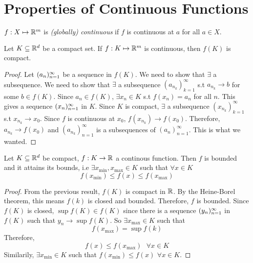 \documentclass[openany]{report}
\begin{document}
    \section{Properties of Continuous Functions}
    $f: X \mapsto \mathbb{R}^m$ is \emph{(globally) continuous} if $f$ is continuous at $a$ for all $a \in X$.
    \begin{theorem}
        Let $K \subseteq \mathbb{R}^d$ be a compact set. If $f: K \mapsto \mathbb{R}^m$ is continuous, then $f(K)$ is compact. 
    \end{theorem}
    \begin{proof}
        Let $({a}_n)_{n=1}^\infty$ be a sequence in $f(K)$. We need to show that $\exists$ a subsequence. We need to show that $\exists$ a subsequence $(a_{n_k})_{k=1}^\infty$ s.t $a_{n_k} \rightarrow b$ for some $b \in f(K)$. Since $a_n \in f(K)$, $\exists x_n \in K$ s.t $f(x_n) = a_n$ for all $n$. This gives a sequence $({x}_n)_{n=1}^\infty$ in $K$. Since $K$ is compact, $\exists$ a subsequence $(x_{n_k})_{k=1}^\infty$ s.t $x_{n_k} \rightarrow x_0$. Since $f$ is continuous at $x_0$, $f(x_{n_k}) \rightarrow f(x_0)$. Therefore, $a_{n_k} \rightarrow f(x_0)$ and $(a_{n_k})_{n=1}^\infty$ is a subsequences of $(a_n)_{n=1}^\infty$. This is what we wanted.
    \end{proof} 
\begin{corollary}
    Let $K \subseteq \mathbb{R}^d$ be compact, $f: K \rightarrow \mathbb{R}$ a continous function. Then $f$ is bounded and it attains its bounds, i.e $\exists x_{\min}, x_{\max} \in K$ such that $\forall x \in K$
    \[f(x_{\min}) \leq f(x) \leq f(x_{\max})\]
\end{corollary}
\begin{proof}
    From the previous result, $f(K)$ is compact in $\mathbb{R}$. By the Heine-Borel theorem, this means $f(k)$ is closed and bounded. Therefore, $f$ is bounded. Since $f(K)$ is closed, $\sup f(K) \in f(K)$ since there is a sequence $({y}_n)_{n=1}^\infty$ in $f(K)$ such that $y_n \rightarrow \sup f(K)$. So $\exists x_{\max} \in K$ such that 
    \[f(x_{\max}) = \sup f(k)\]
    Therefore, 
    \[f(x) \leq f(x_{\max}) \text{  } \forall x \in K\]
    Similarily, $\exists x_{\min} \in K$ such that $f(x_{\min}) \leq f(x)$ $\forall x \in K$. 
\end{proof}

\end{document}
